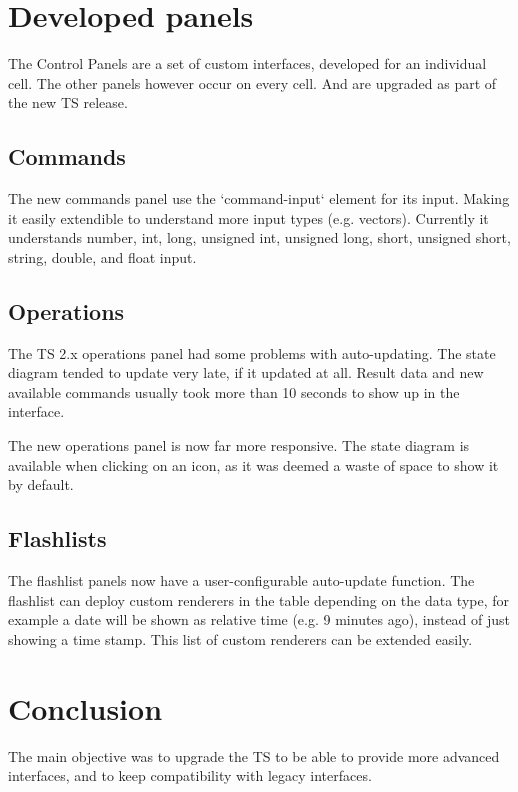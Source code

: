 \documentclass[journal,compsoc,a4paper]{IEEEtran}
\begin{document}

\section{Developed panels}
The Control Panels are a set of custom interfaces, developed for an individual cell.
The other panels however occur on every cell. And are upgraded as part of the
new TS release.
\subsection{Commands}
The new commands panel use the `command-input` element for its input. Making it
easily extendible to understand more input types (e.g. vectors).
Currently it understands number, int, long, unsigned int, unsigned long, short,
unsigned short, string, double, and float input.

\subsection{Operations}
The TS 2.x operations panel had some problems with auto-updating.
The state diagram tended to update very late, if it updated at all.
Result data and new available commands usually took more than 10 seconds to
show up in the interface.

The new operations panel is now far more responsive.
The state diagram is available when clicking on an icon, as it was deemed a
waste of space to show it by default.

\subsection{Flashlists}

The flashlist panels now have a user-configurable auto-update function.
The flashlist can deploy custom renderers in the table depending on the data type,
for example a date will be shown as relative time (e.g. 9 minutes ago), instead
of just showing a time stamp. This list of custom renderers can be extended
easily.


\section{Conclusion}
The main objective was to upgrade the TS to be able to provide more advanced
interfaces, and to keep compatibility with legacy interfaces.
\end{document}
